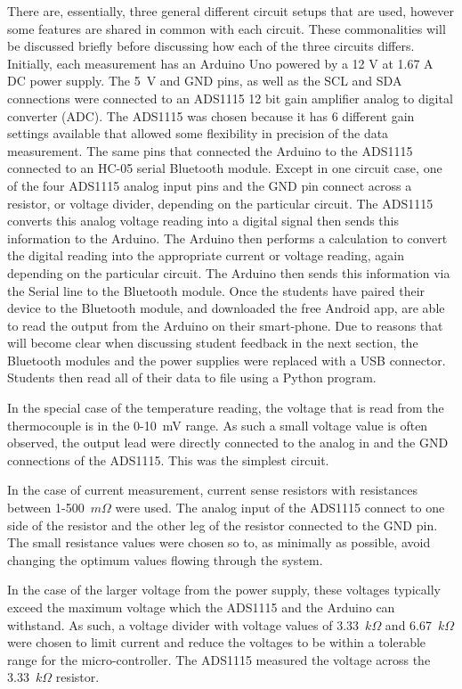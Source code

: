 There are, essentially, three general different circuit setups that are used, however some features are shared in common with each circuit.
These commonalities will be discussed briefly before discussing how each of the three circuits differs.
Initially, each measurement has an Arduino Uno powered by a 12 V at 1.67 A DC power supply.
The 5~V and GND pins, as well as the SCL and SDA connections were connected to an ADS1115 12 bit gain amplifier analog to digital converter (ADC).
The ADS1115 was chosen because it has 6 different gain settings available that allowed some flexibility in precision of the data measurement.
The same pins that connected the Arduino to the ADS1115 connected to an HC-05 serial Bluetooth module.
Except in one circuit case, one of the four ADS1115 analog input pins and the GND pin connect across a resistor, or voltage divider, depending on the particular circuit.
The ADS1115 converts this analog voltage reading into a digital signal then sends this information to the Arduino.
The Arduino then performs a calculation to convert the digital reading into the appropriate current or voltage reading, again depending on the particular circuit.
The Arduino then sends this information via the Serial line to the Bluetooth module.
Once the students have paired their device to the Bluetooth module, and downloaded the free Android app, are able to read the output from the Arduino on their smart-phone.
Due to reasons that will become clear when discussing student feedback in the next section, the Bluetooth modules and the power supplies were replaced with a USB connector.
Students then read all of their data to file using a Python program.

In the special case of the temperature reading, the voltage that is read from the thermocouple is in the 0-10~mV range.
As such a small voltage value is often observed, the output lead were directly connected to the analog in and the GND connections of the ADS1115.
This was the simplest circuit.

In the case of current measurement, current sense resistors with resistances between 1-500~$m\Omega$ were used.
The analog input of the ADS1115 connect to one side of the resistor and the other leg of the resistor connected to the GND pin.
The small resistance values were chosen so to, as minimally as possible, avoid changing the optimum values flowing through the system.

In the case of the larger voltage from the power supply, these voltages typically exceed the maximum voltage which the ADS1115 and the Arduino can withstand.
As such, a voltage divider  with voltage values of 3.33~$k\Omega$ and 6.67~$k\Omega$ were chosen to limit current and reduce the voltages to be within a tolerable range for the micro-controller.
The ADS1115 measured the voltage across the 3.33~$k\Omega$ resistor.
